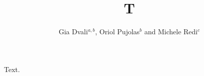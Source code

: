 \documentclass[aps,prd]{revtex4-1}
\begin{document}
\title{T}
\author{Gia Dvali$^{a,b}$, Oriol Pujolas$^b$ and Michele Redi$^c$}
\address{$^a$CERN, Theory Division, Geneva}
\address{$^b$CCPP, New York University, New York}
\address{$^c$ITPP, EPFL, Lausanne}
\maketitle
Text.
\end{document}
